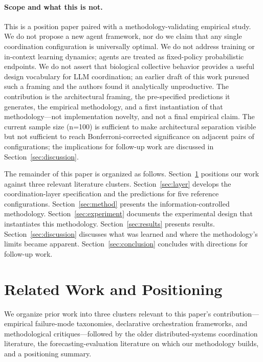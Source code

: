 \documentclass[11pt]{article}
\begin{document}
\paragraph{Scope and what this is not.}
This is a position paper paired with a methodology-validating empirical study. We do not propose a new agent framework, nor do we claim that any single coordination configuration is universally optimal. We do not address training or in-context learning dynamics; agents are treated as fixed-policy probabilistic endpoints. We do not assert that biological collective behavior provides a useful design vocabulary for LLM coordination; an earlier draft of this work pursued such a framing and the authors found it analytically unproductive. The contribution is the architectural framing, the pre-specified predictions it generates, the empirical methodology, and a first instantiation of that methodology---not implementation novelty, and not a final empirical claim. The current sample size (n=100) is sufficient to make architectural separation visible but not sufficient to reach Bonferroni-corrected significance on adjacent pairs of configurations; the implications for follow-up work are discussed in Section~\ref{sec:discussion}.

The remainder of this paper is organized as follows. Section~\ref{sec:related} positions our work against three relevant literature clusters. Section~\ref{sec:layer} develops the coordination-layer specification and the predictions for five reference configurations. Section~\ref{sec:method} presents the information-controlled methodology. Section~\ref{sec:experiment} documents the experimental design that instantiates this methodology. Section~\ref{sec:results} presents results. Section~\ref{sec:discussion} discusses what was learned and where the methodology's limits became apparent. Section~\ref{sec:conclusion} concludes with directions for follow-up work.

\section{Related Work and Positioning}
\label{sec:related}

We organize prior work into three clusters relevant to this paper's contribution---empirical failure-mode taxonomies, declarative orchestration frameworks, and methodological critiques---followed by the older distributed-systems coordination literature, the forecasting-evaluation literature on which our methodology builds, and a positioning summary.
\end{document}
